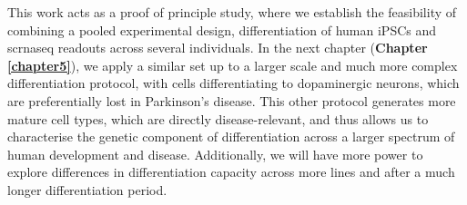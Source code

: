 This work acts as a proof of principle study, where we establish the feasibility of combining a pooled experimental design, differentiation of human iPSCs and \gls{scrnaseq} readouts across several individuals.
In the next chapter (\textbf{Chapter \ref{chapter5}}), we apply a similar set up to a larger scale and much more complex differentiation protocol, with cells differentiating to dopaminergic neurons, which are preferentially lost in Parkinson's disease.
This other protocol generates more mature cell types, which are directly disease-relevant, and thus allows us to characterise the genetic component of differentiation across a larger spectrum of human development and disease.
Additionally, we will have more power to explore differences in differentiation capacity across more lines and after a much longer differentiation period.